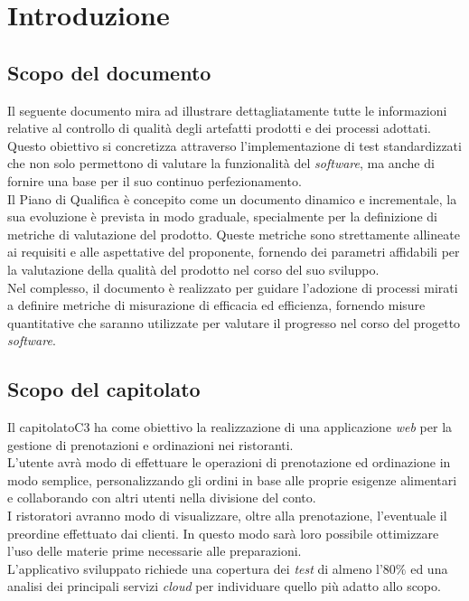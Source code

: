 \section{Introduzione}
\subsection{Scopo del documento}
Il seguente documento mira ad illustrare dettagliatamente tutte le informazioni
relative al controllo di qualità degli artefatti prodotti e dei processi
adottati.
Questo obiettivo si concretizza attraverso l'implementazione di test standardizzati che non solo permettono di valutare la funzionalità del \textit{software}, ma anche di fornire una base per il suo continuo perfezionamento. \\
Il Piano di Qualifica è concepito come un documento dinamico e incrementale, la sua evoluzione è prevista in modo graduale, specialmente per la definizione di metriche di valutazione del prodotto.
Queste metriche sono strettamente allineate ai requisiti e alle aspettative del
proponente, fornendo dei parametri affidabili per la valutazione della qualità
del prodotto nel corso del suo sviluppo. \\
Nel complesso, il documento è realizzato per guidare l'adozione di processi mirati a definire metriche di misurazione di efficacia ed efficienza, fornendo misure quantitative che saranno utilizzate per valutare il progresso nel corso del progetto \textit{software}.

\subsection{Scopo del capitolato}
Il capitolato\g C3 ha come obiettivo la realizzazione di una applicazione \textit{web} per la gestione di prenotazioni e ordinazioni nei ristoranti. \\
L'utente avrà modo di effettuare le operazioni di prenotazione ed ordinazione in modo semplice, personalizzando gli ordini in base alle proprie esigenze alimentari e collaborando con altri utenti nella divisione del conto. \\
I ristoratori avranno modo di visualizzare, oltre alla prenotazione, l'eventuale il preordine effettuato dai clienti.
In questo modo sarà loro possibile ottimizzare l'uso delle materie prime necessarie alle preparazioni. \\
L'applicativo sviluppato richiede una copertura dei \textit{test} di almeno l'$80\%$ ed una analisi dei principali servizi \textit{cloud} per individuare quello più adatto allo scopo.

